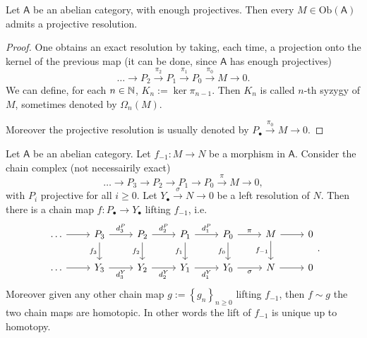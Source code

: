 \begin{lem}
	Let $\mathsf{A}$ be an abelian category, with enough projectives.
	Then every $M \in \mathrm{Ob} \left(\mathsf{A}\right)$ admits a
	projective resolution.
\end{lem} 
\begin{proof}
	One obtains an exact resolution by taking, each time, a projection onto the kernel of the previous map
	(it can be done, since $\mathsf{A}$ has enough projectives)
	\begin{equation}
	\ldots \to P_2 \xrightarrow{\pi_2} P_1 \xrightarrow{\pi_1} P_0 \xrightarrow{\pi_0} M \to 0
	.\end{equation} 
	We can define, for each $n \in \mathbb{N}$, $K_n := \ker \pi_{n-1}$.
	Then $K_n$ is called $n$-th syzygy of $M$, sometimes
	denoted by $\Omega_n(M)$.

	Moreover the projective resolution is usually
	denoted by $P_{\bullet} \xrightarrow{\pi_0} M \to 0$.
\end{proof}

\begin{thm}[Comparison]
	Let $\mathsf{A}$ be an abelian category.
	Let $f_{-1}: M \to N$ be a morphism in $\mathsf{A}$.
	Consider the chain complex (not necessairily exact)
	\begin{equation}
	\ldots \to P_3 \to P_2 \to P_1 \to P_0 \xrightarrow{\pi} 
	M \to 0
	,\end{equation} 
	with $P_i$ projective for all $i \geq 0$.
	Let $Y_{\bullet} \xrightarrow{\sigma} N \to 0$ be a left resolution of $N$.
	Then there is a chain map $f: P_{\bullet} \to Y_{\bullet}$ lifting $f_{-1}$,
	i.e.
	\begin{equation}
	\begin{tikzcd}
		\ldots \arrow[r, "", rightarrow] &
		P_3 \arrow[r, "d_3^P", rightarrow] \arrow[d, "f_3"', rightarrow] &
		P_2 \arrow[r, "d_2^P", rightarrow] \arrow[d, "f_2"', rightarrow] &
		P_1 \arrow[r, "d_1^P", rightarrow] \arrow[d, "f_1"', rightarrow] &
		P_0 \arrow[r, "\pi", rightarrow] \arrow[d, "f_0"', rightarrow] &
		M \arrow[r, "", rightarrow] \arrow[d, "f_{-1}"', rightarrow] &
		0\\
		\ldots \arrow[r, "", rightarrow] &
		Y_3 \arrow[r, "d_3^Y"', rightarrow] &
		Y_2 \arrow[r, "d_2^Y"', rightarrow] &
		Y_1 \arrow[r, "d_1^Y"', rightarrow] &
		Y_0 \arrow[r, "\sigma"', rightarrow] &
		N \arrow[r, "", rightarrow] &
		0
	\end{tikzcd}
	.\end{equation} 
	Moreover given any other chain map $g := \left\{ g_n \right\}_{n \geq 0}$
	lifting $f_{-1}$, then $f \sim g$ the two chain maps are homotopic.
	In other words the lift of $f_{-1}$ is unique up to homotopy.
\end{thm}

